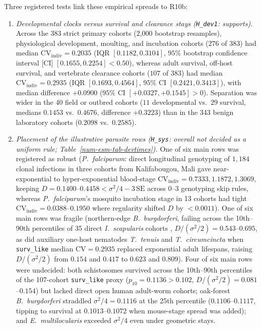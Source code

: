 Three registered tests link these empirical spreads to R10b:
\begin{enumerate}
\item \emph{Developmental clocks versus survival and clearance stays (\texttt{H\_dev1}: supports).} Across the 383 strict primary cohorts (2,000 bootstrap resamples), physiological development, moulting, and incubation cohorts ($276$ of $383$) had median $\mathrm{CV}_{\mathrm{indiv}} = 0.2035$ (IQR $[0.1182, 0.3104]$, $95\%$ bootstrap confidence interval [CI] $[0.1655, 0.2254] < 0.50$), whereas adult survival, off-host survival, and vertebrate clearance cohorts ($107$ of $383$) had median $\mathrm{CV}_{\mathrm{indiv}} = 0.2935$ (IQR $[0.1693, 0.4564]$, $95\%$ CI $[0.2421, 0.3413]$), with median difference $+0.0900$ ($95\%$ CI $[+0.0327, +0.1545] > 0$). Separation was wider in the 40 field or outbred cohorts ($11$ developmental vs.\ $29$ survival, medians $0.1453$ vs.\ $0.4676$, difference $+0.3223$) than in the 343 benign laboratory cohorts ($0.2098$ vs.\ $0.2585$).
\item \emph{Placement of the illustrative parasite rows (\texttt{H\_sys}: overall not decided as a uniform rule; Table~\ref{num-esm-tab-devtimes}).} One of six main rows was registered as robust (\emph{P.~falciparum}: direct longitudinal genotyping of $1{,}184$ clonal infections in three cohorts from Kalifabougou, Mali \citep{andrade2024} gave near-exponential to hyper-exponential blood-stage $\mathrm{CV}_{\mathrm{indiv}} = 0.7333, 1.1872, 1.3069$, keeping $D = 0.1400$--$0.4458 < \sigma^2/4 - 3\,\mathrm{SE}$ across $0$--$3$ genotyping skip rules, whereas \emph{P.~falciparum}'s mosquito incubation stage in 13 cohorts had tight $\mathrm{CV}_{\mathrm{indiv}} = 0.0388$--$0.1950$ where regularity shifted $D$ by $< 0.0011$). One of six main rows was fragile (northern-edge \emph{B.~burgdorferi}, failing across the 10th--90th percentiles of 35 direct \emph{I.~scapularis} cohorts \citep{brunner2022}, $D/(\sigma^2/2) = 0.543$--$0.695$, as did auxiliary one-host nematodes \emph{T.~tenuis} and \emph{T.~circumcincta} when \texttt{surv\_like} median $\mathrm{CV} = 0.2935$ replaced exponential adult lifespans, raising $D/(\sigma^2/2)$ from $0.154$ and $0.417$ to $0.623$ and $0.809$). Four of six main rows were undecided: both schistosomes survived across the 10th--90th percentiles of the 107-cohort \texttt{surv\_like} proxy ($p_{10} = 0.1136 > 0.102$, $D/(\sigma^2/2) = 0.081$--$0.154$) but lacked direct open human adult-worm cohorts; oak-forest \emph{B.~burgdorferi} straddled $\sigma^2/4 = 0.1116$ at the 25th percentile ($0.1106$--$0.1117$, tipping to survival at $0.1013$--$0.1072$ when mouse-stage spread was added); and \emph{E.~multilocularis} exceeded $\sigma^2/4$ even under geometric stays.

\end{enumerate}
